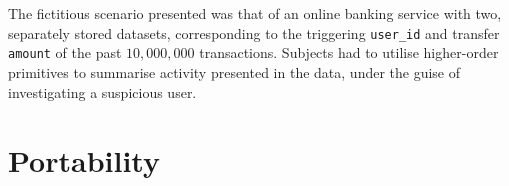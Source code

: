 The fictitious scenario presented was that of an online banking service with two, separately stored datasets, corresponding to the triggering \verb|user_id| and transfer \verb|amount| of the past $10,000,000$ transactions. Subjects had to utilise higher-order primitives to summarise activity presented in the data, under the guise of investigating a suspicious user.
\afterpage{
  \clearpage
  \begin{landscape}
    
  \end{landscape}
  \clearpage
  \begin{landscape}
    

  \end{landscape}
}
\section{Portability}
